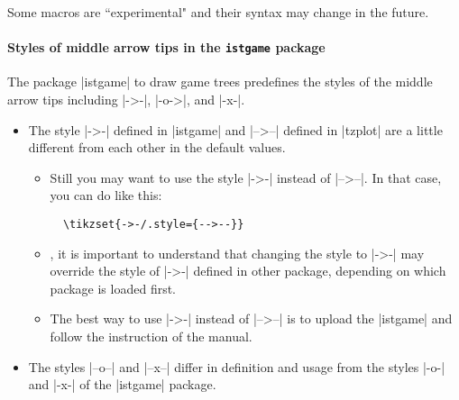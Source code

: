 \bigskip
Some macros are ``experimental" and their syntax may change in the future.

\paragraph{Styles of middle arrow tips in the \texttt{istgame} package}
The package |istgame| to draw game trees predefines the styles of the middle arrow tips including |->-|, |-o->|, and |-x-|.
\begin{itemize}\firmlist
\item The style |->-| defined in |istgame| and |-->--| defined in |tzplot| are a little different from each other in the default values.
  \begin{itemize}
  \item Still you may want to use the style |->-| instead of |-->--|. In that case, you can do like this:
  \begin{verbatim}
  \tikzset{->-/.style={-->--}}
  \end{verbatim}
  \item {}, it is important to understand that changing the style to |->-| may override the style of |->-| defined in other package, depending on which package is loaded first.
  \item The best way to use |->-| instead of |-->--| is to upload the |istgame| and follow the instruction of the manual.
  \end{itemize}
\item The styles |--o--| and |--x--| differ in definition and usage from the styles |-o-| and |-x-| of the |istgame| package.
\end{itemize}



